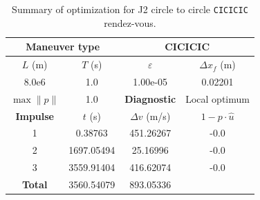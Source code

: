 \begin{table}[htpb]
    \centering
    \begin{tabular}{cccc} \toprule
    \multicolumn{2}{c}{\textbf{Maneuver type}} & \multicolumn{2}{c}{CICICIC} \\ \midrule
    \(L\) (m) & \(T\) (s) & \(\varepsilon\) & \(\Delta x_{f}\) (m)    \\ \midrule
    8.0e6          & 1.0          & 1.00e-05                & 0.02201                        \\ \midrule
    \(\max \lVert p \rVert\) & 1.0     & \textbf{Diagnostic}   & Local optimum        \\ \midrule
    \textbf{Impulse} & \(t\) (s) & \(\Delta v\) (m/s) & \(1 - p \cdot \hat{u}\) \\ \midrule
    1                 & 0.38763          & 451.26267             & -0.0                    \\
    2                 & 1697.05494          & 25.16996             & -0.0                    \\
    3                 & 3559.91404          & 416.62074             & -0.0                    \\\midrule
    \textbf{Total}   & 3560.54079          & 893.05336             &                     \\ \bottomrule   
    \end{tabular}
    \caption{Summary of optimization for J2 circle to circle \texttt{CICICIC} rendez-vous.}
    \label{tab:j2_c2c_CICICIC_tab}
\end{table}

